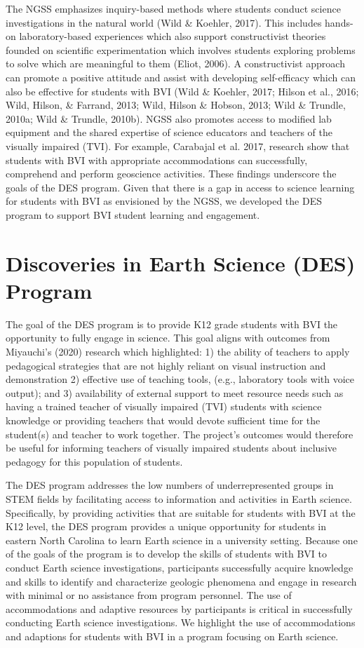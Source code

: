 \documentclass[11.5pt]{sig-alternate}
\begin{document}
\begin{large}
The NGSS emphasizes inquiry-based methods where students conduct science investigations in the natural world (Wild \& Koehler, 2017). This includes hands-on laboratory-based experiences which also support constructivist theories founded on scientific experimentation which involves students exploring problems to solve which are meaningful to them (Eliot, 2006).   A constructivist approach can promote a positive attitude and assist with developing self-efficacy which can also be effective for students with BVI (Wild \& Koehler, 2017; Hilson et al., 2016; Wild, Hilson, \& Farrand, 2013; Wild, Hilson \& Hobson, 2013; Wild \& Trundle, 2010a; Wild \& Trundle, 2010b). NGSS also promotes access to modified lab equipment and the shared expertise of science educators and teachers of the visually impaired (TVI). For example, Carabajal et al. 2017, research show that students with BVI with appropriate accommodations can successfully, comprehend and perform geoscience activities. These findings underscore the goals of the DES program. Given that there is a gap in access to science learning for students with BVI as envisioned by the NGSS, we developed the DES program to support BVI student learning and engagement. 

\section*{Discoveries in Earth Science (DES) Program}

The goal of the DES program is to provide K12 grade students with BVI the opportunity to fully engage in science. This goal aligns with outcomes from Miyauchi’s (2020) research which highlighted: 1) the ability of teachers to apply pedagogical strategies that are not highly reliant on visual instruction and demonstration 2) effective use of teaching tools, (e.g., laboratory tools with voice output); and 3) availability of external support to meet resource needs such as having a trained teacher of visually impaired (TVI) students with science knowledge or providing teachers that would devote sufficient time for the student(s) and teacher to work together. The project’s outcomes would therefore be useful for informing teachers of visually impaired students about inclusive pedagogy for this population of students.

The DES program addresses the low numbers of underrepresented groups in STEM fields by facilitating access to information and activities in Earth science. Specifically, by providing activities that are suitable for students with BVI at the K12 level, the DES program provides a unique opportunity for students in eastern North Carolina to learn Earth science in a university setting. Because one of the goals of the program is to develop the skills of students with BVI to conduct Earth science investigations, participants successfully acquire knowledge and skills to identify and characterize geologic phenomena and engage in research with minimal or no assistance from program personnel. The use of accommodations and adaptive resources by participants is critical in successfully conducting Earth science investigations.  We highlight the use of accommodations and adaptions for students with BVI in a program focusing on Earth science.


\end{large}
\end{document}
